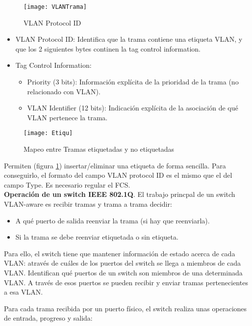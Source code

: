 \documentclass[10pt,portrait, twocolumn]{article}
\begin{document}
\begin{figure}[!ht]	
	\centering
    	\texttt{[image: VLANTrama]}
	\caption{VLAN Protocol ID}
\end{figure} 

\begin{itemize}
\item VLAN Protocol ID: Identifica que la trama contiene una etiqueta VLAN, y que los 2 siguientes bytes continen la tag control information.
\item Tag Control Information:
	\begin{itemize}
	\item Priority (3 bits): Información explícita de la prioridad de la trama (no relacionado con VLAN).
	\item VLAN Identifier (12 bits): Indicación explícita de la asociación de qué VLAN pertenece la trama.
	\end{itemize}
\end{itemize}

\begin{figure}[!ht]	
	\centering
    	\texttt{[image: Etiqu]}
	\caption{Mapeo entre Tramas etiquetadas y no etiquetadas}
	\label{fig:Eti}
\end{figure} 

Permiten (figura \ref{fig:Eti}) insertar/eliminar una etiqueta de forma sencilla. Para conseguirlo, el formato del campo VLAN protocol ID es el mismo que el del campo Type. Es necesario regular el FCS.\\

\textbf{Operación de un switch IEEE 802.1Q}. El trabajo princpal de un switch VLAN-aware es recibir tramas y trama a trama decidir:

	\begin{itemize}
	\item A qué puerto de salida reenviar la trama (si hay que reenviarla).
	\item Si la trama se debe reenviar etiquetada o sin etiqueta.
	\end{itemize}
	
Para ello, el switch tiene que mantener información de estado acerca de cada VLAN: através de cuáles de los puertos del switch se llega a miembros de cada VLAN. Identifican qué puertos de un switch son miembros de una determinada VLAN. A través de esos puertos se pueden recibir y enviar tramas pertenecientes a esa VLAN. 

	\quad Para cada trama recibida por un puerto físico, el switch realiza unas operaciones de entrada, progreso y salida:
	
\end{document}

